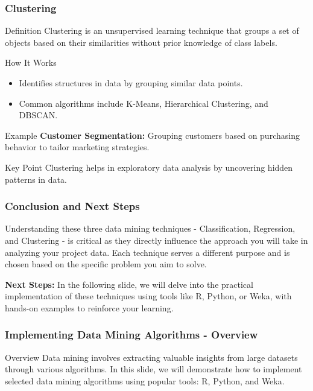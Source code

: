 \documentclass{beamer}
\begin{document}
\begin{frame}[fragile]
    \frametitle{Clustering}
    \begin{block}{Definition}
        Clustering is an unsupervised learning technique that groups a set of objects based on their similarities without prior knowledge of class labels.
    \end{block}
    
    \begin{block}{How It Works}
        \begin{itemize}
            \item Identifies structures in data by grouping similar data points.
            \item Common algorithms include K-Means, Hierarchical Clustering, and DBSCAN.
        \end{itemize}
    \end{block}
    
    \begin{block}{Example}
        \textbf{Customer Segmentation:} Grouping customers based on purchasing behavior to tailor marketing strategies.
    \end{block}
    
    \begin{block}{Key Point}
        Clustering helps in exploratory data analysis by uncovering hidden patterns in data.
    \end{block}
\end{frame}

\begin{frame}[fragile]
    \frametitle{Conclusion and Next Steps}
    Understanding these three data mining techniques - Classification, Regression, and Clustering - is critical as they directly influence the approach you will take in analyzing your project data. Each technique serves a different purpose and is chosen based on the specific problem you aim to solve.
    
    \textbf{Next Steps:} In the following slide, we will delve into the practical implementation of these techniques using tools like R, Python, or Weka, with hands-on examples to reinforce your learning.
\end{frame}

\begin{frame}
    \frametitle{Implementing Data Mining Algorithms - Overview}
    \begin{block}{Overview}
        Data mining involves extracting valuable insights from large datasets through various algorithms. 
        In this slide, we will demonstrate how to implement selected data mining algorithms using popular tools: R, Python, and Weka.
    \end{block}
\end{frame}
\end{document}
